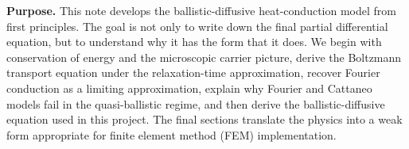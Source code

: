 \documentclass[11pt]{article}
\begin{document}

\begin{overviewbox}
\textbf{Purpose.} This note develops the ballistic-diffusive heat-conduction model from first principles. The goal is not only to write down the final partial differential equation, but to understand why it has the form that it does. We begin with conservation of energy and the microscopic carrier picture, derive the Boltzmann transport equation under the relaxation-time approximation, recover Fourier conduction as a limiting approximation, explain why Fourier and Cattaneo models fail in the quasi-ballistic regime, and then derive the ballistic-diffusive equation used in this project. The final sections translate the physics into a weak form appropriate for finite element method (FEM) implementation.
\end{overviewbox}

\ProjectTOC
\end{document}
